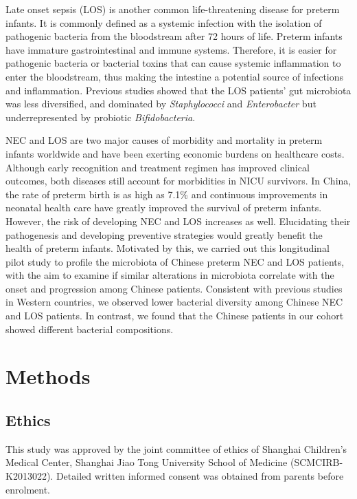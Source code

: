 \documentclass[fleqn,10pt]{wlpeerj} %
\begin{document}
Late onset sepsis (LOS) is another common life-threatening disease for preterm infants.  It is commonly defined as a systemic infection with the isolation of pathogenic bacteria from the bloodstream after 72 hours of life\citep{rao2016one, pickering2012red}. Preterm infants have immature gastrointestinal and immune systems.  Therefore, it is easier for  pathogenic bacteria or bacterial toxins that can cause systemic inflammation to enter the bloodstream\citep{schwiertz2003development, bezirtzoglou2011microbiota, Cernada2016Sepsis, Sharon2015Gut, korpela2018intestinal}, thus making the intestine a potential source of infections and inflammation.  Previous studies showed that the LOS patients' gut microbiota was less diversified, and dominated by \textit{Staphylococci} and \textit{Enterobacter} but underrepresented by probiotic \textit{Bifidobacteria}\citep{madan2012gut,tarr2016gut,Stewart2017Longitudinal,korpela2018intestinal,ficara2018changes}.

NEC and LOS are two major causes of morbidity and mortality in preterm infants worldwide and have been exerting economic burdens on healthcare costs\citep{johnson2013cost,johnson2014economic, mowitz2018cost}. Although early recognition and treatment regimen has improved clinical outcomes, both diseases still account for morbidities in NICU survivors\citep{hintz2005neurodevelopmental, zonnenberg2019neurodevelopmental, shah2015risk}.
In China, the rate of preterm birth is as high as 7.1\%\citep{blencowe2012national} and continuous improvements in neonatal health care have greatly improved the survival of preterm infants. However, the risk of developing NEC and LOS increases as well. Elucidating their pathogenesis and developing preventive strategies would greatly benefit the health of preterm infants. Motivated by this, we carried out this longitudinal pilot study to profile the microbiota of Chinese preterm NEC and LOS patients, with the aim to examine if similar alterations in microbiota correlate with the onset and progression among Chinese patients.   Consistent with previous studies in Western countries, we observed lower bacterial diversity among Chinese NEC and LOS patients.  In contrast, we found that the Chinese patients in our cohort showed different bacterial compositions.

\section*{Methods}
  \subsection*{Ethics}
  This study was approved by the joint committee of ethics of Shanghai Children’s Medical Center, Shanghai Jiao Tong University School of Medicine (SCMCIRB-K2013022). Detailed written informed consent was obtained from parents before enrolment.
\end{document}
